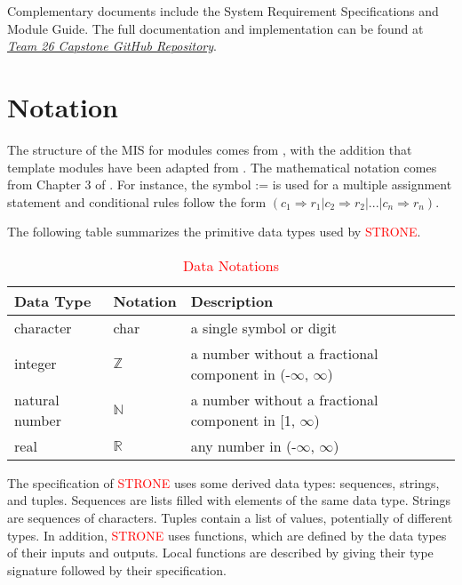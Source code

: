 \documentclass[12pt, titlepage]{article}
\begin{document}
\noindent Complementary documents include the System Requirement Specifications
and Module Guide.  The full documentation and implementation can be
found at \href{https://github.com/jordanbierbrier/capstone}{\textit{Team 26 Capstone GitHub Repository}}.

\section{Notation}
The structure of the MIS for modules comes from \citet{HoffmanAndStrooper1995},
with the addition that template modules have been adapted from
\cite{GhezziEtAl2003}.  The mathematical notation comes from Chapter 3 of
\citet{HoffmanAndStrooper1995}.  For instance, the symbol := is used for a
multiple assignment statement and conditional rules follow the form $(c_1
\Rightarrow r_1 | c_2 \Rightarrow r_2 | ... | c_n \Rightarrow r_n )$.

\noindent The following table summarizes the primitive data types used by \sout{\progname} \textcolor{red}{STRONE}. 


\renewcommand{\arraystretch}{1.2} 
\begin{table}[H]
\centering
\begin{tabular}{l l p{7.5cm}} 
\toprule 
\textbf{Data Type} & \textbf{Notation} & \textbf{Description}\\ 
\midrule
character & char & a single symbol or digit\\
integer & $\mathbb{Z}$ & a number without a fractional component in (-$\infty$, $\infty$) \\
natural number & $\mathbb{N}$ & a number without a fractional component in [1, $\infty$) \\
real & $\mathbb{R}$ & any number in (-$\infty$, $\infty$)\\
\bottomrule
\end{tabular} 
\caption{\textcolor{red}{Data Notations}}
\end{table}


\noindent
The specification of \sout{\progname} \textcolor{red}{STRONE} uses some derived data types: sequences, strings, and
tuples. Sequences are lists filled with elements of the same data type. Strings
are sequences of characters. Tuples contain a list of values, potentially of
different types. In addition, \sout{\progname} \textcolor{red}{STRONE} uses functions, which
are defined by the data types of their inputs and outputs. Local functions are
described by giving their type signature followed by their specification.
\end{document}
